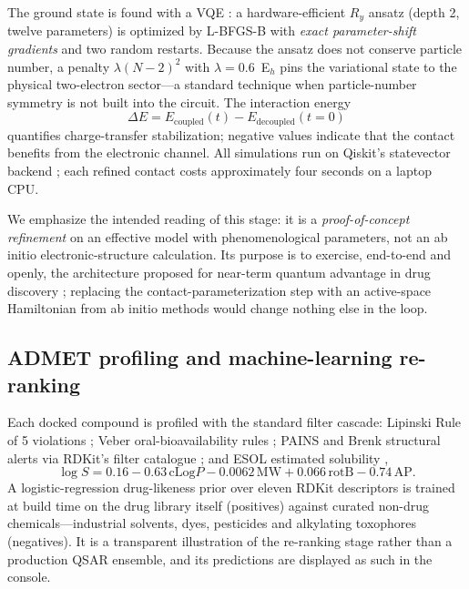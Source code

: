 \documentclass[10pt,a4paper,twocolumn]{article}
\newcommand{\de}{\Delta E}
\begin{document}
The ground state is found with a VQE \cite{peruzzo2014}: a hardware-efficient
$R_y$ ansatz (depth 2, twelve parameters) is optimized by L-BFGS-B with \emph{exact
parameter-shift gradients} and two random restarts. Because the ansatz does not conserve
particle number, a penalty $\lambda (N-2)^2$ with $\lambda = 0.6$~E$_h$ pins the
variational state to the physical two-electron sector---a standard technique when
particle-number symmetry is not built into the circuit. The interaction energy
\begin{equation}
\de = E_{\text{coupled}}(t) - E_{\text{decoupled}}(t{=}0)
\end{equation}
quantifies charge-transfer stabilization; negative values indicate that the contact
benefits from the electronic channel. All simulations run on Qiskit's statevector
backend \cite{qiskit2024}; each refined contact costs approximately four seconds on a
laptop CPU.

We emphasize the intended reading of this stage: it is a \emph{proof-of-concept
refinement} on an effective model with phenomenological parameters, not an ab initio
electronic-structure calculation. Its purpose is to exercise, end-to-end and
openly, the architecture proposed for near-term quantum advantage in drug discovery
\cite{cao2019,li2024}; replacing the contact-parameterization step with an active-space
Hamiltonian from ab initio methods would change nothing else in the loop.

\subsection{ADMET profiling and machine-learning re-ranking}

Each docked compound is profiled with the standard filter cascade: Lipinski Rule of 5
violations \cite{lipinski1997}; Veber oral-bioavailability rules \cite{veber2002};
PAINS and Brenk structural alerts via RDKit's filter catalogue \cite{baell2010}; and
ESOL estimated solubility \cite{delaney2004},
\begin{equation}
\log S = 0.16 - 0.63\,\mathrm{cLog}P - 0.0062\,\mathrm{MW} + 0.066\,\mathrm{rotB} - 0.74\,\mathrm{AP}.
\end{equation}
A logistic-regression drug-likeness prior over eleven RDKit descriptors is trained at
build time on the drug library itself (positives) against curated non-drug
chemicals---industrial solvents, dyes, pesticides and alkylating toxophores
(negatives). It is a transparent illustration of the re-ranking stage rather than a
production QSAR ensemble, and its predictions are displayed as such in the console.
\end{document}
